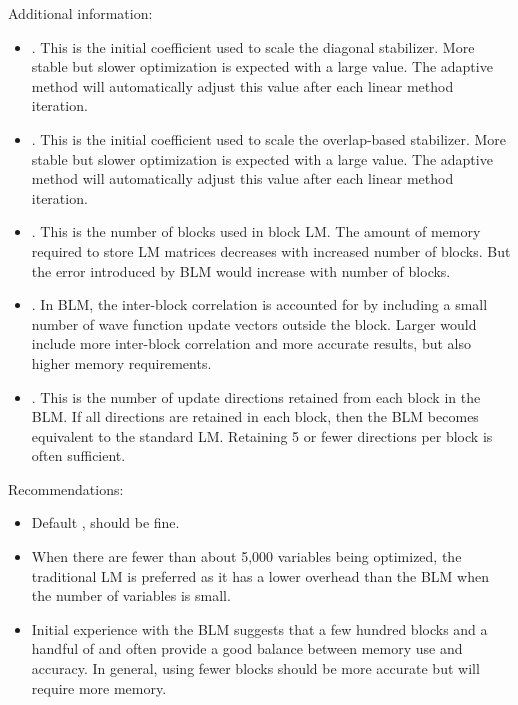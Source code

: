 Additional information:
\begin{itemize}
  \item {}.  This is the initial coefficient used to scale the diagonal stabilizer.
                            More stable but slower optimization is expected with a large value.
                            The adaptive method will automatically adjust this value after each linear method iteration.
  \item {}.  This is the initial coefficient used to scale the overlap-based stabilizer.
                            More stable but slower optimization is expected with a large value.
                            The adaptive method will automatically adjust this value after each linear method iteration.
  \item {}.   This is the number of blocks used in block LM. The amount of memory required to store LM matrices decreases
                            with increased number of blocks. But the error introduced by BLM would increase with number of blocks.  
  \item {}.     In BLM, the inter-block correlation is accounted for by including a small number of wave function update vectors
                            outside the block. Larger  would include more inter-block correlation and more accurate results, but 
                            also higher memory requirements. 
  \item {}.     This is the number of update directions retained from each block in the BLM. If all directions are retained in each block, 
                            then the BLM becomes equivalent to the standard LM.  Retaining 5 or fewer directions per block is often sufficient.
\end{itemize}

Recommendations:
\begin{itemize}
  \item Default ,  should be fine. 
  \item When there are fewer than about 5,000 variables being optimized, the traditional LM is preferred as it has a lower overhead than the BLM when the number of variables is small.
  \item Initial experience with the BLM suggests that a few hundred blocks and a handful of  and 
        often provide a good balance between memory use and accuracy.  In general, using fewer blocks should be more accurate but will require more memory.
\end{itemize}


